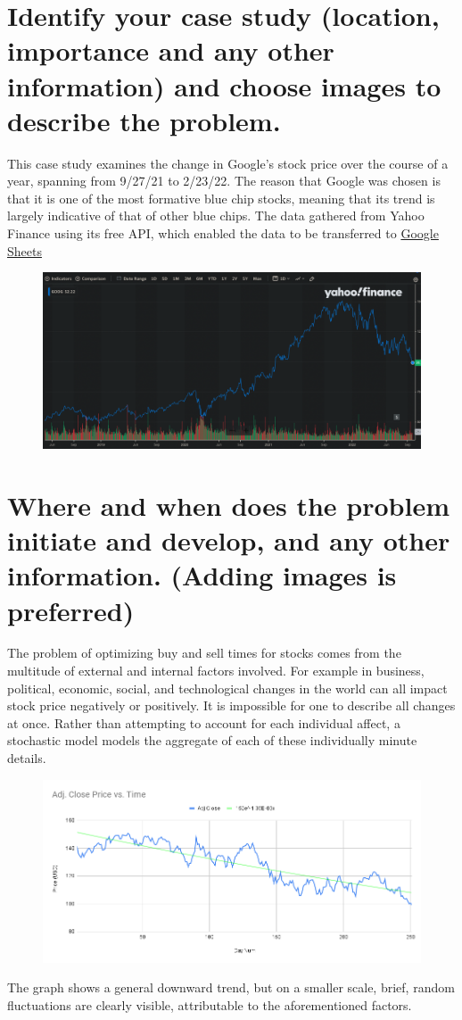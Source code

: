 \documentclass[12pt, A4]{article}
\begin{document}
		\section{Identify your case study (location, importance and any other information) and choose images to describe the problem.}
			This case study examines the change in Google's stock price over the course of a year, spanning from 9/27/21 to 2/23/22. The reason that Google was chosen is that it is one of the most formative blue chip stocks, meaning that its trend is largely indicative of that of other blue chips. The data gathered from Yahoo Finance using its free API, which enabled the data to be transferred to \href{https://docs.google.com/spreadsheets/d/1nHchrcg5L4Kxjrzgh3KIcOWF7ycs6TPHX1PvEtsnAVo/edit#gid=1382113726}{Google Sheets}
			\begin{figure}[H]
				\includegraphics[width = \textwidth]{Images/Finance_Graph.png}
			\end{figure}
		\section{Where and when does the problem initiate and develop, and any other information. (Adding images is preferred)}
			The problem of optimizing buy and sell times for stocks comes from the multitude of external and internal factors involved. For example in business, political, economic, social, and technological changes in the world can all impact stock price negatively or positively. It is impossible for one to describe all changes at once. Rather than attempting to account for each individual affect, a stochastic model models the aggregate of each of these individually minute details.
			\begin{figure}[H]
				\includegraphics[width = \textwidth]{Images/Sheets_Graph.png}
			\end{figure}
			The graph shows a general downward trend, but on a smaller scale, brief, random fluctuations are clearly visible, attributable to the aforementioned factors. 
\end{document}
